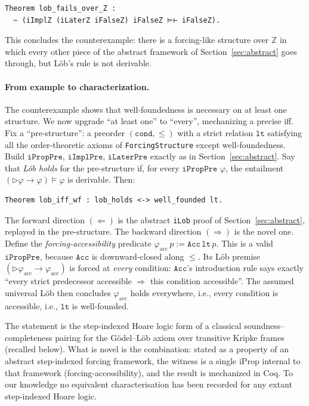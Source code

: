 \begin{lstlisting}
Theorem lob_fails_over_Z :
  ~ (iImplZ (iLaterZ iFalseZ) iFalseZ ⊨⊢ iFalseZ).
\end{lstlisting}

This concludes the counterexample: there is a forcing-like structure
over $\mathbb{Z}$ in which every other piece of the abstract
framework of Section~\ref{sec:abstract} goes through, but Löb's rule
is not derivable.

\paragraph{From example to characterization.}
The counterexample shows that well-foundedness is necessary on at
least one structure.  We now upgrade ``at least one'' to ``every'',
mechanizing a precise iff.  Fix a ``pre-structure'': a preorder
$(\mathtt{cond}, \le)$ with a strict relation $\mathtt{lt}$ satisfying
all the order-theoretic axioms of \texttt{ForcingStructure} except
well-foundedness.  Build $\mathtt{iPropPre}$,
$\mathtt{iImplPre}$, $\mathtt{iLaterPre}$ exactly as in
Section~\ref{sec:abstract}.  Say that \emph{L\"ob holds} for the
pre-structure if, for every $\mathtt{iPropPre}$ $\varphi$, the
entailment
$(\triangleright \varphi \to \varphi) \vDash \varphi$ is derivable.
Then:

\begin{lstlisting}
Theorem lob_iff_wf : lob_holds <-> well_founded lt.
\end{lstlisting}

\noindent
The forward direction $(\Leftarrow)$ is the abstract \texttt{iLob}
proof of Section~\ref{sec:abstract}, replayed in the pre-structure.
The backward direction $(\Rightarrow)$ is the novel one.  Define the
\emph{forcing-accessibility} predicate
$\varphi_{\mathrm{acc}}\, p := \mathtt{Acc}\, \mathtt{lt}\, p$. This is
a valid $\mathtt{iPropPre}$, because $\mathtt{Acc}$ is downward-closed
along $\le$.  Its L\"ob premise
$(\triangleright \varphi_{\mathrm{acc}} \to \varphi_{\mathrm{acc}})$ is
forced at \emph{every} condition: $\mathtt{Acc}$'s introduction rule
says exactly ``every strict predecessor accessible $\Rightarrow$ this
condition accessible''.  The assumed universal L\"ob then concludes
$\varphi_{\mathrm{acc}}$ holds everywhere, i.e., every condition is
accessible, i.e., $\mathtt{lt}$ is well-founded.

The statement is the step-indexed Hoare logic form of a classical
soundness--completeness pairing for the G\"odel--L\"ob axiom over
transitive Kripke frames (recalled below).  What is novel is the
combination: stated as a property of an abstract step-indexed forcing
framework, the witness is a single iProp internal to that framework
(forcing-accessibility), and the result is mechanized in Coq.  To our
knowledge no equivalent characterisation has been recorded for any
extant step-indexed Hoare logic.

